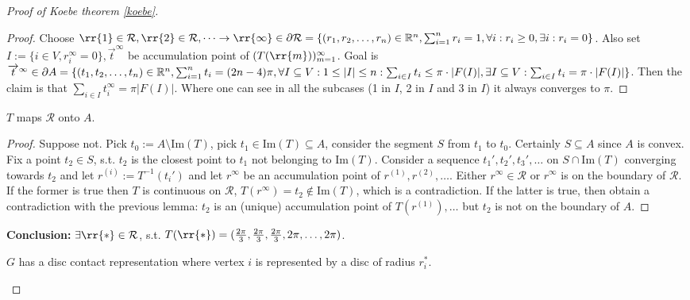 \begin{proof}[Proof of Koebe theorem \ref{koebe}]
	\begin{proof}
		Choose $\rr{1} \in \mathcal{R}, \rr{2} \in \mathcal{R}, \dots \to \rr{\infty} \in \partial \mathcal{R} = \{(r_1, r_2, \dots, r_n) \in \R^n, \sum_{i = 1}^{n} r_i = 1, \forall i : r_i \geq 0, \exists i : r_i = 0\}$. Also set $I := \{i \in V, r_i^\infty = 0\}, \overrightarrow{t}^\infty$ be accumulation point of $(T(\rr{m}))_{m= 1}^\infty$. Goal is $\overrightarrow{t}^\infty \in \partial A =  \{(t_1, t_2, \dots, t_n) \in \mathbb{R}^n, \sum_{i = 1}^n t_i = (2n-4)\pi, \forall I \subseteq V : 1 \leq |I| \leq n: \sum_{i \in I} t_i \leq \pi \cdot |F(I)|, \exists I \subseteq V : \sum_{i \in I} t_i = \pi \cdot |F(I)|\}$. Then the claim is that $\sum_{i \in I} t_i^\infty = \pi |F(I)|$. Where one can see in all the subcases (1 in $I$, 2 in $I$ and 3 in $I$) it always converges to $\pi$.
	\end{proof}

	\begin{lemma}[\ref{koebe-first-d}]
		$T$ maps $\mathcal{R}$ onto $A$.
	\end{lemma}

	\begin{proof}
		Suppose not. Pick $t_0 := A \setminus \text{Im}(T)$, pick $t_1 \in \text{Im}(T) \subseteq A$, consider the segment $S$ from $t_1$ to $t_0$. Certainly $S \subseteq A$ since $A$ is convex. Fix a point $t_2 \in S$, s.t. $t_2$ is the closest point to $t_1$ not belonging to $\text{Im}(T)$. Consider a sequence $t_1', t_2', t_3', \dots$ on $S \cap \text{Im}(T)$ converging towards $t_2$ and let $r^{(i)} := T^{-1}(t_i')$ and let $r^\infty$ be an accumulation point of $r^{(1)}, r^{(2)}, \dots$. Either $r^\infty \in \mathcal{R}$ or $r^\infty$ is on the boundary of $\mathcal{R}$. If the former is true then $T$ is continuous on $\mathcal{R}$, $T(r^\infty) = t_2 \notin \text{Im}(T)$, which is a contradiction. If the latter is true, then obtain a contradiction with the previous lemma: $t_2$ is an (unique) accumulation point of $T(r^{(1)}), \dots$ but $t_2$ is not on the boundary of $A$.
	\end{proof}

	\noindent \textbf{Conclusion:} $\exists \rr{\ast} \in \mathcal{R}$, s.t. $T(\rr{\ast}) = (\frac{2\pi}{3}, \frac{2\pi}{3}, \frac{2\pi}{3}, 2\pi, \dots, 2\pi)$.
	
	\begin{claim}[\ref{koebe-second}]
		$G$ has a disc contact representation where vertex $i$ is represented by a disc of radius $r_i^\ast$.
	\end{claim}


\end{proof}

